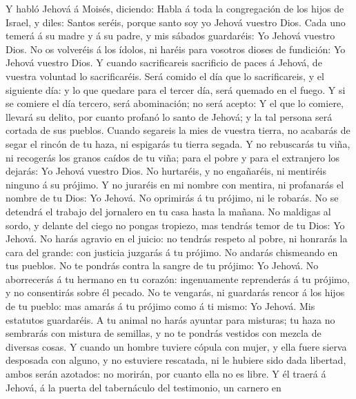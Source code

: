  Y habló Jehová á Moisés, diciendo:  Habla á
toda la congregación de los hijos de Israel, y diles: Santos seréis,
porque santo soy yo Jehová vuestro Dios.  Cada uno temerá
á su madre y á su padre, y mis sábados guardaréis: Yo Jehová vuestro
Dios.  No os volveréis á los ídolos, ni haréis para
vosotros dioses de fundición: Yo Jehová vuestro Dios.  Y
cuando sacrificareis sacrificio de paces á Jehová, de vuestra voluntad
lo sacrificaréis.  Será comido el día que lo
sacrificareis, y el siguiente día: y lo que quedare para el tercer día,
será quemado en el fuego.  Y si se comiere el día tercero,
será abominación; no será acepto:  Y el que lo comiere,
llevará su delito, por cuanto profanó lo santo de Jehová; y la tal
persona será cortada de sus pueblos.  Cuando segareis la
mies de vuestra tierra, no acabarás de segar el rincón de tu haza, ni
espigarás tu tierra segada.  Y no rebuscarás tu viña, ni
recogerás los granos caídos de tu viña; para el pobre y para el
extranjero los dejarás: Yo Jehová vuestro Dios.  No
hurtaréis, y no engañaréis, ni mentiréis ninguno á su prójimo.
 Y no juraréis en mi nombre con mentira, ni profanarás el
nombre de tu Dios: Yo Jehová.  No oprimirás á tu prójimo,
ni le robarás. No se detendrá el trabajo del jornalero en tu casa hasta
la mañana.  No maldigas al sordo, y delante del ciego no
pongas tropiezo, mas tendrás temor de tu Dios: Yo Jehová.
 No harás agravio en el juicio: no tendrás respeto al
pobre, ni honrarás la cara del grande: con justicia juzgarás á tu
prójimo.  No andarás chismeando en tus pueblos. No te
pondrás contra la sangre de tu prójimo: Yo Jehová.  No
aborrecerás á tu hermano en tu corazón: ingenuamente reprenderás á tu
prójimo, y no consentirás sobre él pecado.  No te
vengarás, ni guardarás rencor á los hijos de tu pueblo: mas amarás á tu
prójimo como á ti mismo: Yo Jehová.  Mis estatutos
guardaréis. A tu animal no harás ayuntar para misturas; tu haza no
sembrarás con mistura de semillas, y no te pondrás vestidos con mezcla
de diversas cosas.  Y cuando un hombre tuviere cópula con
mujer, y ella fuere sierva desposada con alguno, y no estuviere
rescatada, ni le hubiere sido dada libertad, ambos serán azotados: no
morirán, por cuanto ella no es libre.  Y él traerá á
Jehová, á la puerta del tabernáculo del testimonio, un carnero en
